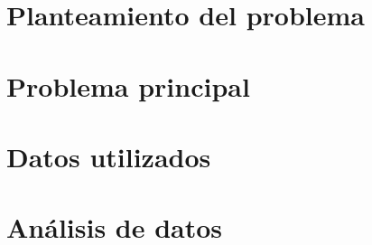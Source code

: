 
\section{Planteamiento del problema}


\section{Problema principal}


\section{Datos utilizados}


\section{Análisis de datos}
